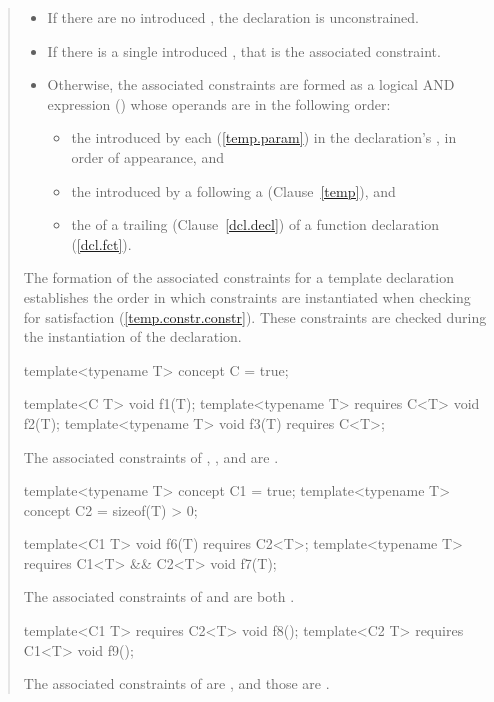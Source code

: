\begin{quote}
\begin{addedblock}
\begin{itemize}
\item If there are no introduced ,
the declaration is unconstrained.

\item If there is a single introduced ,
that is the associated constraint.

\item Otherwise, the associated constraints are formed as a logical 
AND expression () whose operands are in the following order:
% 
\begin{itemize}
\item the  introduced by each
       (\ref{temp.param}) in the 
      declaration's , in
      order of appearance, and

\item the  introduced
      by a  following a 
       (Clause~\ref{temp}), and

\item the  of a trailing 
       (Clause~\ref{dcl.decl}) 
      of a function declaration (\ref{dcl.fct}).
\end{itemize}
\end{itemize}
% 
The formation of the associated constraints for a template declaration
establishes the order in which constraints are instantiated when checking 
for satisfaction (\ref{temp.constr.constr}).
% 
\enternote
These constraints are checked during the instantiation of the declaration.
\exitnote
% 
\enterexample
\begin{codeblock}
template<typename T> concept C = true;

template<C T> void f1(T);
template<typename T> requires C<T> void f2(T);
template<typename T> void f3(T) requires C<T>;
\end{codeblock}
The associated constraints of , , and 
are .
% 
\begin{codeblock}
template<typename T> concept C1 = true;
template<typename T> concept C2 = sizeof(T) > 0;

template<C1 T> void f6(T) requires C2<T>;
template<typename T> requires C1<T> && C2<T> void f7(T);
\end{codeblock}
The associated constraints of  and  are both
.
% 
\begin{codeblock}
template<C1 T> requires C2<T> void f8();
template<C2 T> requires C1<T> void f9();
\end{codeblock}
% 
The associated constraints of  are
, and those  are
.
\exitexample


\end{addedblock}
\end{quote}
